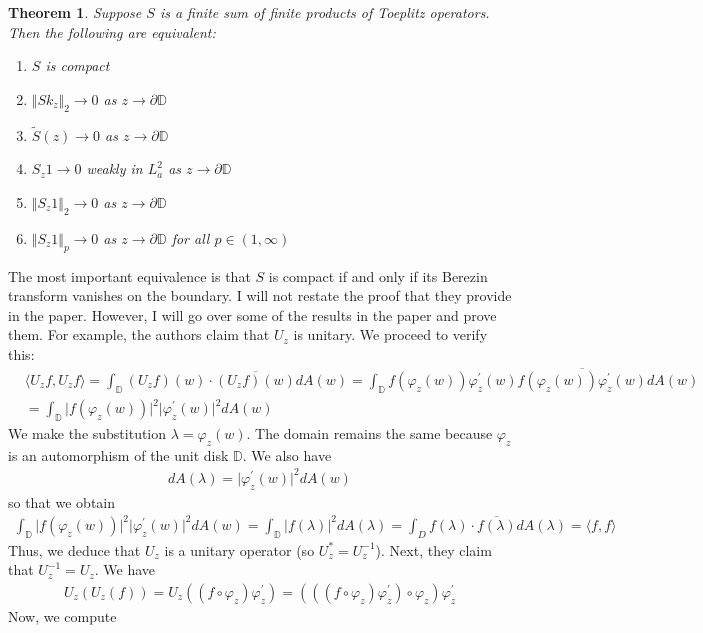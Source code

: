 \documentclass[12pt]{article}
\newtheorem{theorem}{Theorem}
\begin{document}
\begin{theorem}
Suppose $S$ is a finite sum of finite products of Toeplitz operators. Then the following are equivalent:
\begin{enumerate}
\item $S$ is compact
\item $\Vert Sk_z \Vert_2 \rightarrow 0$ as $z \rightarrow \partial{\mathbb{D}}$
\item $\tilde{S}(z) \rightarrow 0$ as $z \rightarrow \partial{\mathbb{D}}$
\item $S_z 1 \rightarrow 0$ weakly in $L_a^2$ as $z \rightarrow \partial{\mathbb{D}}$
\item $\Vert S_z 1 \Vert_2 \rightarrow 0$ as $z \rightarrow \partial{\mathbb{D}}$
\item $\Vert S_z 1\Vert_p \rightarrow 0$ as $z \rightarrow \partial{\mathbb{D}}$ for all $p \in (1,\infty)$
\end{enumerate}
\end{theorem}
 The most important equivalence is that $S$ is compact if and only if its Berezin transform vanishes on the boundary. I will not restate the proof that they provide in the paper. However, I will go over some of the results in the paper and prove them. For example, the authors claim that $U_z$ is unitary. We proceed to verify this:
\begin{align*}
&\langle U_z f, U_zf \rangle = \int_\mathbb{D} (U_z f)(w) \cdot \overline{(U_z f)(w)} dA(w) = \int_\mathbb{D} f(\varphi_z(w))\varphi_z^\prime(w) \overline{f(\varphi_z(w))\varphi_z^\prime(w)} dA(w)\\
&= \int_\mathbb{D} \vert f(\varphi_z(w)) \vert^2 \vert \varphi_z^\prime(w) \vert^2 dA(w)
\end{align*}
 We make the substitution $\lambda = \varphi_z(w)$. The domain remains the same because $\varphi_z$ is an automorphism of the unit disk $\mathbb{D}$. We also have
\begin{align*}
dA(\lambda) = \vert \varphi_z^\prime(w) \vert^2 dA(w)
\end{align*} so that we obtain
\begin{align*}
\int_\mathbb{D} \vert f(\varphi_z(w)) \vert^2 \vert \varphi_z^\prime(w) \vert^2 dA(w) = \int_\mathbb{D} \vert f(\lambda) \vert^2 dA(\lambda) = \int_D f(\lambda) \cdot \overline{f(\lambda)} dA(\lambda) = \langle f, f \rangle
\end{align*} Thus, we deduce that $U_z$ is a unitary operator (so $U_z^* = U_z^{-1}$). Next, they claim that $U_z^{-1} = U_z$. We have
\begin{align*}
U_z(U_z(f)) = U_z((f\circ \varphi_z)\varphi_z^\prime) = (((f \circ \varphi_z)\varphi_z^\prime)\circ \varphi_z) \varphi_z^\prime
\end{align*} Now, we compute
\end{document}
